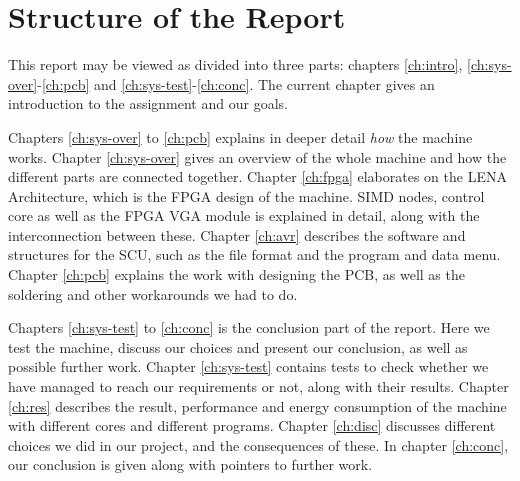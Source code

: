 \section{Structure of the Report}

This report may be viewed as divided into three parts: chapters
\ref{ch:intro}, \ref{ch:sys-over}-\ref{ch:pcb} and
\ref{ch:sys-test}-\ref{ch:conc}. The
current chapter gives an introduction to the assignment and our goals.

Chapters \ref{ch:sys-over} to \ref{ch:pcb} explains in deeper detail {\em how}
the machine works. Chapter \ref{ch:sys-over} gives an overview of the whole
machine and how the different parts are connected together. Chapter
\ref{ch:fpga} elaborates on the \ac{LENA} Architecture, which is the \ac{FPGA}
design of the machine. \ac{SIMD} nodes, control core as well as the \ac{FPGA}
\ac{VGA} module is explained in detail, along with the interconnection between
these. Chapter \ref{ch:avr} describes the software and structures for the \ac{SCU},
such as the file format and the program and data menu. Chapter \ref{ch:pcb}
explains the work with designing the \ac{PCB}, as well as the soldering and
other workarounds we had to do.

Chapters \ref{ch:sys-test} to \ref{ch:conc} is the conclusion part of the
report. Here we test the machine, discuss our choices and present our
conclusion, as well as possible further work. Chapter \ref{ch:sys-test} contains
tests to check whether we have managed to reach our requirements or not, along
with their results. Chapter \ref{ch:res} describes the result, performance and
energy consumption of the machine with different cores and different
programs. Chapter \ref{ch:disc} discusses different choices we did in our
project, and the consequences of these. In chapter \ref{ch:conc}, our conclusion is
given along with pointers to further work.
